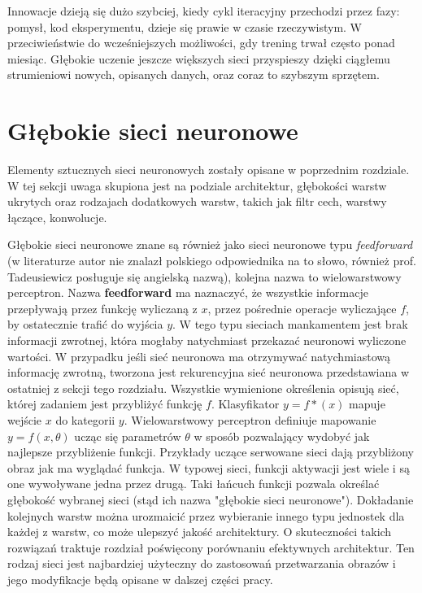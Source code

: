 \documentclass[12pt,a4paper,twoside,titlepage,openright]{book}
\begin{document}
\begin{itemize}
\begin{itemize}
Innowacje dzieją się dużo szybciej, kiedy cykl iteracyjny przechodzi przez fazy: pomysł, kod eksperymentu, dzieje się prawie w czasie rzeczywistym. W przeciwieństwie do wcześniejszych możliwości, gdy trening trwał często ponad miesiąc. Głębokie uczenie jeszcze większych sieci przyspieszy dzięki ciągłemu strumieniowi nowych, opisanych danych, oraz coraz to szybszym sprzętem.

\section{Głębokie sieci neuronowe}
Elementy sztucznych sieci neuronowych zostały opisane w poprzednim rozdziale. W tej sekcji uwaga skupiona jest na podziale architektur, głębokości warstw ukrytych oraz rodzajach dodatkowych warstw, takich jak filtr cech, warstwy łączące, konwolucje.

Głębokie sieci neuronowe znane są również jako sieci neuronowe typu \textit{feedforward} (w literaturze autor nie znalazł polskiego odpowiednika na to słowo, również prof. Tadeusiewicz posługuje się angielską nazwą), kolejna nazwa to wielowarstwowy perceptron. Nazwa \textbf{feedforward} ma naznaczyć, że wszystkie informacje przepływają przez funkcję wyliczaną z \(x\), przez pośrednie operacje wyliczające \(f\), by ostatecznie trafić do wyjścia \(y\). W tego typu sieciach mankamentem jest brak informacji zwrotnej, która mogłaby natychmiast przekazać neuronowi wyliczone wartości. W przypadku jeśli sieć neuronowa ma otrzymywać natychmiastową informację zwrotną, tworzona jest rekurencyjna sieć neuronowa przedstawiana w ostatniej z sekcji tego rozdziału. Wszystkie wymienione określenia opisują sieć, której zadaniem jest przybliżyć funkcję \(f\). Klasyfikator \(y = f*(x) \) mapuje wejście \(x\) do kategorii \(y\). Wielowarstwowy perceptron definiuje mapowanie \(y = f(x,\theta)\) ucząc się parametrów \(\theta\) w sposób pozwalający wydobyć jak najlepsze przybliżenie funkcji. Przykłady uczące serwowane sieci dają przybliżony obraz jak ma wyglądać funkcja. W typowej sieci, funkcji aktywacji jest wiele i są one wywoływane jedna przez drugą. Taki łańcuch funkcji pozwala określać głębokość wybranej sieci (stąd ich nazwa "głębokie sieci neuronowe"). Dokładanie kolejnych warstw można urozmaicić przez wybieranie innego typu jednostek dla każdej z warstw, co może ulepszyć jakość architektury. O skuteczności takich rozwiązań traktuje rozdział poświęcony porównaniu efektywnych architektur. Ten rodzaj sieci jest najbardziej użyteczny do zastosowań przetwarzania obrazów i jego modyfikacje będą opisane w dalszej części pracy.


\end{itemize}
\end{itemize}
\end{document}
